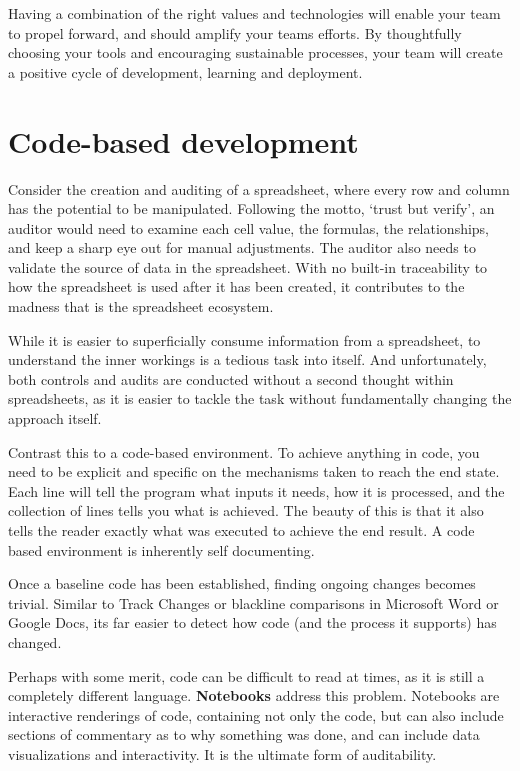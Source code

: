 \documentclass[
]{book}
\begin{document}
Having a combination of the right values and technologies will enable your team to propel forward, and should amplify your teams efforts. By thoughtfully choosing your tools and encouraging sustainable processes, your team will create a positive cycle of development, learning and deployment.

\hypertarget{code-based-development}{%
\section{Code-based development}\label{code-based-development}}

Consider the creation and auditing of a spreadsheet, where every row and column has the potential to be manipulated. Following the motto, `trust but verify', an auditor would need to examine each cell value, the formulas, the relationships, and keep a sharp eye out for manual adjustments. The auditor also needs to validate the source of data in the spreadsheet. With no built-in traceability to how the spreadsheet is used after it has been created, it contributes to the madness that is the spreadsheet ecosystem.

While it is easier to superficially consume information from a spreadsheet, to understand the inner workings is a tedious task into itself. And unfortunately, both controls and audits are conducted without a second thought within spreadsheets, as it is easier to tackle the task without fundamentally changing the approach itself.

Contrast this to a code-based environment. To achieve anything in code, you need to be explicit and specific on the mechanisms taken to reach the end state. Each line will tell the program what inputs it needs, how it is processed, and the collection of lines tells you what is achieved. The beauty of this is that it also tells the reader exactly what was executed to achieve the end result. A code based environment is inherently self documenting.

Once a baseline code has been established, finding ongoing changes becomes trivial. Similar to Track Changes or blackline comparisons in Microsoft Word or Google Docs, its far easier to detect how code (and the process it supports) has changed.

Perhaps with some merit, code can be difficult to read at times, as it is still a completely different language. \textbf{Notebooks} address this problem. Notebooks are interactive renderings of code, containing not only the code, but can also include sections of commentary as to why something was done, and can include data visualizations and interactivity. It is the ultimate form of auditability.
\end{document}
